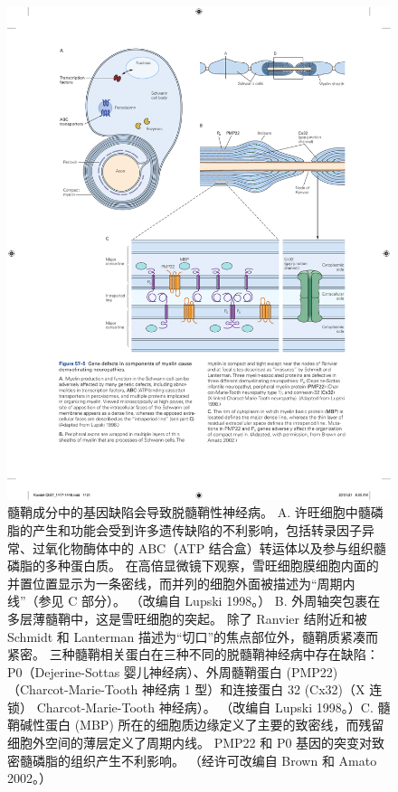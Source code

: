 \begin{figure}[htbp]
	\centering
	\includegraphics[width=0.95\linewidth]{chap57/fig_57_5}
	\caption{髓鞘成分中的基因缺陷会导致脱髓鞘性神经病。 A. 许旺细胞中髓磷脂的产生和功能会受到许多遗传缺陷的不利影响，包括转录因子异常、过氧化物酶体中的 ABC（ATP 结合盒）转运体以及参与组织髓磷脂的多种蛋白质。 在高倍显微镜下观察，雪旺细胞膜细胞内面的并置位置显示为一条密线，而并列的细胞外面被描述为“周期内线”（参见 C 部分）。 （改编自 Lupski 1998。） B. 外周轴突包裹在多层薄髓鞘中，这是雪旺细胞的突起。 除了 Ranvier 结附近和被 Schmidt 和 Lanterman 描述为“切口”的焦点部位外，髓鞘质紧凑而紧密。 三种髓鞘相关蛋白在三种不同的脱髓鞘神经病中存在缺陷：P0（Dejerine-Sottas 婴儿神经病）、外周髓鞘蛋白 (PMP22)（Charcot-Marie-Tooth 神经病 1 型）和连接蛋白 32 (Cx32)（X 连锁） Charcot-Marie-Tooth 神经病）。 （改编自 Lupski 1998。）C. 髓鞘碱性蛋白 (MBP) 所在的细胞质边缘定义了主要的致密线，而残留细胞外空间的薄层定义了周期内线。 PMP22 和 P0 基因的突变对致密髓磷脂的组织产生不利影响。 （经许可改编自 Brown 和 Amato 2002。）}
	\label{fig:57_5}
\end{figure}

